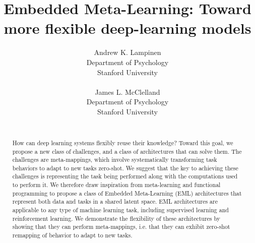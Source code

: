 \documentclass{article}
\begin{document}
\title{Embedded Meta-Learning: Toward more flexible deep-learning models}
\author{%
Andrew K. Lampinen\\
Department of Psychology\\
Stanford University\\
\\
\And
James L. McClelland\\
Department of Psychology\\
Stanford University\\
\\
}
\date{}
\maketitle

\begin{abstract}
How can deep learning systems flexibly reuse their knowledge? Toward this goal, we propose a new class of challenges, and a class of architectures that can solve them. The challenges are meta-mappings, which involve systematically transforming task behaviors to adapt to new tasks zero-shot. We suggest that the key to achieving these challenges is representing the task being performed along with the computations used to perform it. We therefore draw inspiration from meta-learning and functional programming to propose a class of Embedded Meta-Learning (EML) architectures that represent both data and tasks in a shared latent space. EML architectures are applicable to any type of machine learning task, including supervised learning and reinforcement learning. We demonstrate the flexibility of these architectures by showing that they can perform meta-mappings, i.e. that they can exhibit zero-shot remapping of behavior to adapt to new tasks. 
\end{abstract}

\vspace{-0.75em} %
\end{document}
